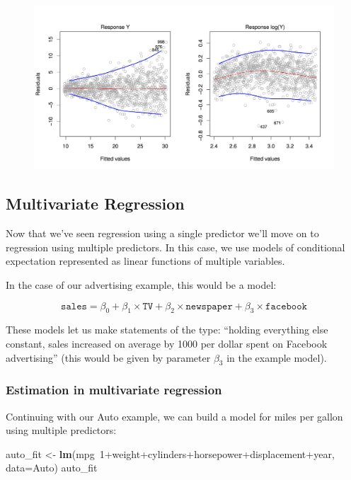 \documentclass[]{article}
\newenvironment{Shaded}{\begin{snugshade}}{\end{snugshade}}
\newcommand{\KeywordTok}[1]{\textcolor[rgb]{0.13,0.29,0.53}{\textbf{{#1}}}}
\newcommand{\DataTypeTok}[1]{\textcolor[rgb]{0.13,0.29,0.53}{{#1}}}
\newcommand{\DecValTok}[1]{\textcolor[rgb]{0.00,0.00,0.81}{{#1}}}
\newcommand{\StringTok}[1]{\textcolor[rgb]{0.31,0.60,0.02}{{#1}}}
\newcommand{\NormalTok}[1]{{#1}}
\theoremstyle{definition}
\theoremstyle{definition}
\theoremstyle{remark}
\begin{document}
\begin{figure}[htbp]
\centering
\includegraphics{img/residual_variance.png}
\caption{}
\end{figure}

\subsection{Multivariate Regression}\label{multivariate-regression}

Now that we've seen regression using a single predictor we'll move on to
regression using multiple predictors. In this case, we use models of
conditional expectation represented as linear functions of multiple
variables.

In the case of our advertising example, this would be a model:

\[
\mathtt{sales} = \beta_0 + \beta_1 \times \mathtt{TV} + \beta_2 \times \mathtt{newspaper} + \beta_3 \times \mathtt{facebook}
\]

These models let us make statements of the type: ``holding everything
else constant, sales increased on average by 1000 per dollar spent on
Facebook advertising'' (this would be given by parameter \(\beta_3\) in
the example model).

\subsubsection{Estimation in multivariate
regression}\label{estimation-in-multivariate-regression}

Continuing with our Auto example, we can build a model for miles per
gallon using multiple predictors:

\begin{Shaded}
\begin{Highlighting}[]
\NormalTok{auto_fit <-}\StringTok{ }\KeywordTok{lm}\NormalTok{(mpg~}\DecValTok{1}\NormalTok{+weight+cylinders+horsepower+displacement+year, }\DataTypeTok{data=}\NormalTok{Auto)}
\NormalTok{auto_fit}
\end{Highlighting}
\end{Shaded}
\end{document}
